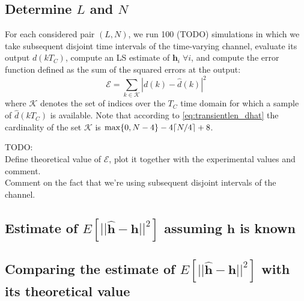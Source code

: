 \documentclass[10pt]{article}
\DeclarePairedDelimiter{\ceil}{\lceil}{\rceil}
\begin{document}
\subsection*{Determine $L$ and $N$}

For each considered pair $(L,N)$, we run 100 (TODO) simulations in which we take subsequent disjoint time intervals of the time-varying channel, evaluate its output $d(kT_C)$, compute an LS estimate of $\mathbf{h}_i \; \forall i$, and compute the error function defined as the sum of the squared errors at the output:
\begin{equation}
	\mathcal{E} = \sum_{k \in \mathcal{K}} |d(k)-\hat{d}(k)|^2
\end{equation}
where $\mathcal{K}$ denotes the set of indices over the $T_C$ time domain for which a sample of $\hat{d}(kT_C)$ is available. Note that according to \eqref{eq:transientlen_dhat} the cardinality of the set $\mathcal{K}$ is $\max \{ 0, N-4 \} - 4 \ceil{N/4} + 8$.


TODO:\\
Define theoretical value of $\mathcal{E}$, plot it together with the experimental values and comment.\\
Comment on the fact that we're using subsequent disjoint intervals of the channel.


\subsection*{Estimate of $E[||\mathbf{\hat{h}}-\mathbf{h}||^2]$ assuming $\mathbf{h}$ is known}

\subsection*{Comparing the estimate of $E[||\mathbf{\hat{h}}-\mathbf{h}||^2]$ with its theoretical value}
\end{document}
